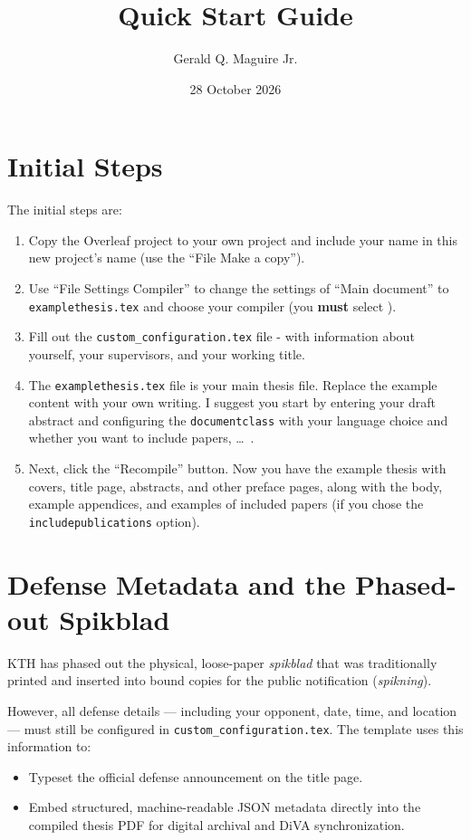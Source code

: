 \documentclass{article}
\title{Quick Start Guide}
\author{Gerald Q. Maguire Jr.}
\date{28 October 2026}
\newcommand{\fname}[1]{\texttt{#1}}
\begin{document}
\maketitle

\section*{Initial Steps}
The initial steps are:
\begin{enumerate}
    \item Copy the Overleaf project to your own project and include your name in this new project's name (use the \enquote{File \textrightarrow Make a copy}).

    \item Use \enquote{File \textrightarrow Settings \textrightarrow Compiler} to change the settings of \enquote{Main document} to \fname{examplethesis.tex} and choose your compiler (you \textbf{must} select \LuaLaTeX{}). 
        
    \item Fill out the \fname{custom\_configuration.tex} file - with information about yourself, your supervisors, and your working title.
        
    \item The \fname{examplethesis.tex} file is your main thesis file. Replace the example content with your own writing. I suggest you start by entering your draft abstract and configuring the \texttt{documentclass} with your language choice and whether you want to include papers, \ldots~. 

    \item Next, click the \enquote{Recompile} button. Now you have the example thesis with covers, title page, abstracts, and other preface pages, along with the body, example appendices, and examples of included papers (if you chose the \texttt{includepublications} option).
\end{enumerate}

\section*{Defense Metadata and the Phased-out Spikblad}
KTH has phased out the physical, loose-paper \emph{spikblad} that was traditionally printed and inserted into bound copies for the public notification (\emph{spikning}). 

However, all defense details --- including your opponent, date, time, and location --- must still be configured in \fname{custom\_configuration.tex}. The template uses this information to:
\begin{itemize}
    \item Typeset the official defense announcement on the title page.
    \item Embed structured, machine-readable JSON metadata directly into the compiled thesis PDF for digital archival and DiVA synchronization.
\end{itemize}
\end{document}

